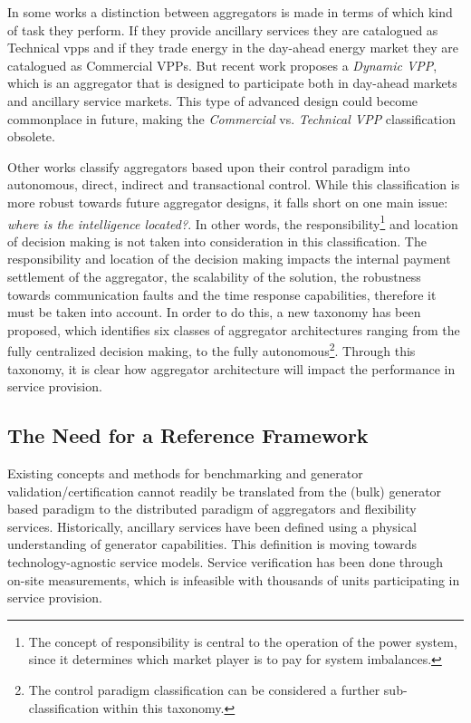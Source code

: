 In some works a distinction between aggregators is made in terms of which kind of task they perform. If they provide ancillary services they are catalogued as Technical \Glspl{vpp} and if they trade energy in the day-ahead energy market they are catalogued as Commercial VPPs. But recent work proposes a \emph{Dynamic VPP}, which is an aggregator that is designed to participate both in day-ahead markets and ancillary service markets. This type of advanced design could become commonplace in future, making the \emph{Commercial} vs. \emph{Technical VPP} classification obsolete.

Other works classify aggregators based upon their control paradigm into autonomous, direct, indirect and transactional control. While this classification is more robust towards future aggregator designs, it falls short on one main issue: \emph{where is the intelligence located?}. In other words, the responsibility\footnote{The concept of responsibility is central to the operation of the power system, since it determines which market player is to pay for system imbalances.} and location of decision making is not taken into consideration in this classification. The responsibility and location of the decision making impacts the internal payment settlement of the aggregator, the scalability of the solution, the robustness towards communication faults and the time response capabilities, therefore it must be taken into account. In order to do this, a new taxonomy has been proposed, which identifies six classes of aggregator architectures ranging from the fully centralized decision making, to the fully autonomous\footnote{The control paradigm classification can be considered a further sub-classification within this taxonomy.}. Through this taxonomy, it is clear how aggregator architecture will impact the performance in service provision.

\subsection{The Need for a Reference Framework} %
\label{sub:ReferenceFramework}
Existing concepts and methods for benchmarking and generator validation/certification cannot readily be translated from the (bulk) generator based paradigm to the distributed paradigm of aggregators and flexibility services. Historically, ancillary services have been defined using a physical understanding of generator capabilities. This definition is moving towards technology-agnostic service models.
Service verification has been done through on-site measurements, which is infeasible with thousands of units participating in service provision.  

